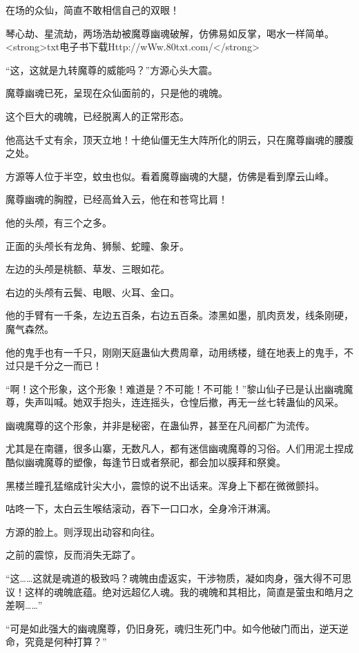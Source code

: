 
\begin{this_body}

在场的众仙，简直不敢相信自己的双眼！

琴心劫、星流劫，两场浩劫被魔尊幽魂破解，仿佛易如反掌，喝水一样简单。<strong>txt电子书下载Http://wWw.80txt.com/</strong>

“这，这就是九转魔尊的威能吗？”方源心头大震。

魔尊幽魂已死，呈现在众仙面前的，只是他的魂魄。

这个巨大的魂魄，已经脱离人的正常形态。

他高达千丈有余，顶天立地！十绝仙僵无生大阵所化的阴云，只在魔尊幽魂的腰腹之处。

方源等人位于半空，蚊虫也似。看着魔尊幽魂的大腿，仿佛是看到摩云山峰。

魔尊幽魂的胸膛，已经高耸入云，他在和苍穹比肩！

他的头颅，有三个之多。

正面的头颅长有龙角、狮鬃、蛇瞳、象牙。

左边的头颅是桃额、草发、三眼如花。

右边的头颅有云鬓、电眼、火耳、金口。

他的手臂有一千条，左边五百条，右边五百条。漆黑如墨，肌肉贲发，线条刚硬，魔气森然。

他的鬼手也有一千只，刚刚天庭蛊仙大费周章，动用绣楼，缝在地表上的鬼手，不过只是千分之一而已！

“啊！这个形象，这个形象！难道是？不可能！不可能！”黎山仙子已是认出幽魂魔尊，失声叫喊。她双手抱头，连连摇头，仓惶后撤，再无一丝七转蛊仙的风采。

幽魂魔尊的这个形象，并非是秘密，在蛊仙界，甚至在凡间都广为流传。

尤其是在南疆，很多山寨，无数凡人，都有迷信幽魂魔尊的习俗。人们用泥土捏成酷似幽魂魔尊的塑像，每逢节日或者祭祀，都会加以膜拜和祭奠。

黑楼兰瞳孔猛缩成针尖大小，震惊的说不出话来。浑身上下都在微微颤抖。

咕咚一下，太白云生喉结滚动，吞下一口口水，全身冷汗淋漓。

方源的脸上。则浮现出动容和向往。

之前的震惊，反而消失无踪了。

“这……这就是魂道的极致吗？魂魄由虚返实，干涉物质，凝如肉身，强大得不可思议！这样的魂魄底蕴。绝对远超亿人魂。我的魂魄和其相比，简直是萤虫和皓月之差啊……”

“可是如此强大的幽魂魔尊，仍旧身死，魂归生死门中。如今他破门而出，逆天逆命，究竟是何种打算？”


\end{this_body}
